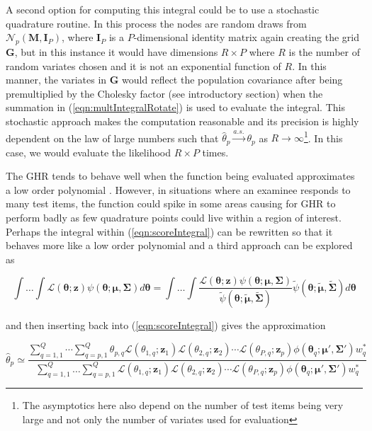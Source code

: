 \documentclass[12pt]{article}
\begin{document}
A second option for computing this integral could be to use a stochastic quadrature routine. In this process the nodes are random draws from $\mathcal{N}_p(\bm{M}, \bm{I}_P)$, where $\bm{I}_P$ is a $P$-dimensional identity matrix again creating the grid $\bm{G}$, but in this instance it would have dimensions $R \times P$ where $R$ is the number of random variates chosen and it is not an exponential function of $R$. In this manner, the variates in $\bm{G}$ would reflect the population covariance after being premultiplied by the Cholesky factor (see introductory section) when the summation in (\ref{eqn:multIntegralRotate}) is used to evaluate the integral. This stochastic approach makes the computation reasonable and its precision is highly dependent on the law of large numbers such that $\widehat{\theta}_p\xrightarrow{a.s.}\theta_p$ as $R\rightarrow\infty$\footnote{The asymptotics here also depend on the number of test items being very large and not only the number of variates used for evaluation}. In this case, we would evaluate the likelihood $R \times P$ times.

The GHR tends to behave well when the function being evaluated approximates a low order polynomial \cite{liu:pierce}. However, in situations where an examinee responds to many test items, the function could spike in some areas causing for GHR to perform badly as few quadrature points could live within a region of interest. Perhaps the integral within (\ref{eqn:scoreIntegral}) can be rewritten so that it behaves more like a low order polynomial \cite{ets:2007,pin:bates,hesketh:skrondal,Tuerlinckx} and a third approach can be explored as

\begin{equation}
\int \dots \int \mathcal{L}(\boldsymbol{\theta};\boldsymbol{z})\psi(\boldsymbol{\theta};\boldsymbol{\mu},\boldsymbol{\Sigma})d\boldsymbol{\theta} = \int \dots \int \frac{\mathcal{L}(\boldsymbol{\theta};\boldsymbol{z})\psi(\boldsymbol{\theta};\boldsymbol{\mu},\boldsymbol{\Sigma})}{\widetilde{\psi}(\boldsymbol{\theta};\widetilde{\boldsymbol{\mu}},\widetilde{\boldsymbol{\Sigma}})}\widetilde{\psi}(\boldsymbol{\theta};\widetilde{\boldsymbol{\mu}},\widetilde{\boldsymbol{\Sigma}})d\boldsymbol{\theta}
\end{equation}

\noindent and then inserting back into (\ref{eqn:scoreIntegral}) gives the approximation

\begin{equation}
\label{eqn:intApprox}
\widehat{\theta}_p \simeq  \frac{\sum^Q_{q=1,1} \cdots \sum^Q_{q=p,1}\theta_{p,q} \mathcal{L}(\theta_{1,q};\bm{z}_1) \mathcal{L}(\theta_{2,q};\bm{z}_2)\cdots \mathcal{L}(\theta_{P,q};\bm{z}_p)\phi(\boldsymbol{\theta}_q;\boldsymbol{\mu}',\boldsymbol{\Sigma'})w^*_q}{\sum^Q_{q=1,1} \ldots\sum^Q_{q=p,1}\mathcal{L}(\theta_{1,q};\bm{z}_1) \mathcal{L}(\theta_{2,q};\bm{z}_2) \cdots \mathcal{L}(\theta_{P,q};\bm{z}_p)\phi(\boldsymbol{\theta}_q;\boldsymbol{\mu}',\boldsymbol{\Sigma'})w^*_q}
\end{equation}
\end{document}

